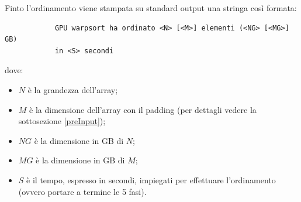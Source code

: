\documentclass[a4paper, 11pt]{article}
\begin{document}
		Finto l'ordinamento viene stampata su standard output una stringa così formata:
		\begin{verbatim}
			GPU warpsort ha ordinato <N> [<M>] elementi (<NG> [<MG>] GB) 
			in <S> secondi
		\end{verbatim}
		dove:
		\begin{itemize}
			\item $N$ è la grandezza dell'array;
			\item $M$ è la dimensione dell'array con il padding (per dettagli vedere la sottosezione \ref{preInput});
			\item $NG$ è la dimensione in GB di $N$;
			\item $MG$ è la dimensione in GB di $M$;
			\item $S$ è il tempo, espresso in secondi, impiegati per effettuare l'ordinamento (ovvero portare a termine le 5 fasi).
		\end{itemize}	
\end{document}
